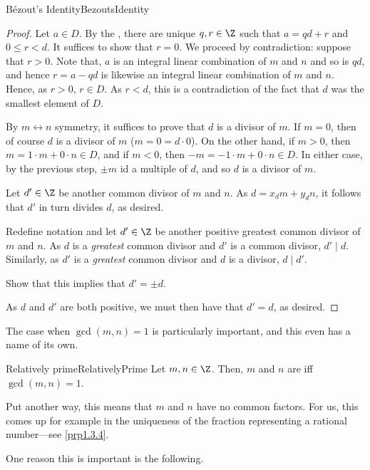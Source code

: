 \begin{thm}{B\'{e}zout's Identity}{BezoutsIdentity}
\begin{proof}
Let $a\in D$.  By the , there are unique $q,r\in \Z$ such that $a=qd+r$ and $0\leq r<d$.  It suffices to show that $r=0$.  We proceed by contradiction:  suppose that $r>0$.  Note that, $a$ is an integral linear combination of $m$ and $n$ and so is $qd$, and hence $r=a-qd$ is likewise an integral linear combination of $m$ and $n$.  Hence, as $r>0$, $r\in D$.  As $r<d$, this is a contradiction of the fact that $d$ was the smallest element of $D$.

By $m\leftrightarrow n$ symmetry, it suffices to prove that $d$ is a divisor of $m$.  If $m=0$, then of course $d$ is a divisor of $m$ ($m=0=d\cdot 0$).  On the other hand, if $m>0$, then $m=1\cdot m+0\cdot n\in D$, and if $m<0$, then $-m=-1\cdot m+0\cdot n\in D$.  In either case, by the previous step, $\pm m$ id a multiple of $d$, and so $d$ is a divisor of $m$.

Let $d'\in \Z$ be another common divisor of $m$ and $n$.  As $d=x_dm+y_dn$, it follows that $d'$ in turn divides $d$, as desired.

Redefine notation and let $d'\in \Z$ be another positive greatest common divisor of $m$ and $n$.  As $d$ is a \emph{greatest} common divisor and $d'$ is a common divisor, $d'\mid d$.  Similarly, as $d'$ is a \emph{greatest} common divisor and $d$ is a divisor, $d\mid d'$.  
\begin{exr}{}{}
Show that this implies that $d'=\pm d$.
\end{exr}
As $d$ and $d'$ are both positive, we must then have that $d'=d$, as desired.
\end{proof}
\end{thm}
The case when $\gcd (m,n)=1$ is particularly important, and this even has a name of its own.
\begin{dfn}{Relatively prime}{RelativelyPrime}
Let $m,n\in \Z$.  Then, $m$ and $n$ are  iff $\gcd (m,n)=1$.
\begin{rmk}
Put another way, this means that $m$ and $n$ have no common factors.  For us, this comes up for example in the uniqueness of the fraction representing a rational number---see \cref{prp1.3.4}.
\end{rmk}
\end{dfn}
One reason this is important is the following.
